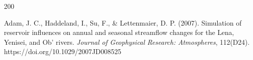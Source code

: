 \documentclass[
12pt, %
english,
onehalfspacing, %
headsepline, %
]{MastersDoctoralThesis} %
\begin{document}
\appendix %



%
%



\renewcommand{\bibname}{References}

\begin{thebibliography}{200} %
\addtolength{\leftmargin}{0.2in} %
\setlength{\itemindent}{-0.2in}

\makeatletter
\def\@biblabel#1{}
\makeatother

Adam, J. C., Haddeland, I., Su, F., \& Lettenmaier, D. P. (2007). Simulation of reservoir influences on annual and seasonal streamflow changes for the Lena, Yenisei, and Ob’ rivers. \emph{Journal of Geophysical Research: Atmospheres}, 112(D24). https://doi.org/10.1029/2007JD008525 





\end{thebibliography}
\end{document}
